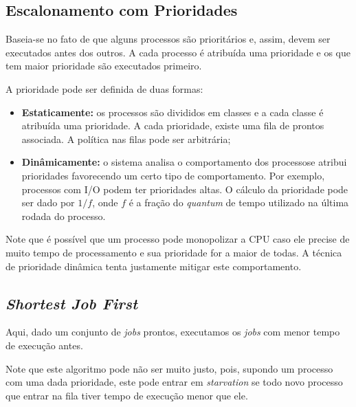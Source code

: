 \subsection{Escalonamento com Prioridades}
Baseia-se no fato de que alguns processos são prioritários e, assim, devem ser executados antes dos outros. A cada processo é atribuída uma prioridade e os que tem maior prioridade são executados primeiro.

A prioridade pode ser definida de duas formas:
\begin{itemize}
  \item \textbf{Estaticamente:} os processos são divididos em classes e a cada classe é atribuída uma prioridade. A cada prioridade, existe uma fila de prontos associada. A política nas filas pode ser arbitrária;

  \item \textbf{Dinâmicamente:} o sistema analisa o comportamento dos processose atribui prioridades favorecendo um certo tipo de comportamento. Por exemplo, processos com I/O podem ter prioridades altas. O cálculo da prioridade pode ser dado por $1/f$, onde $f$ é a fração do \textit{quantum} de tempo utilizado na última rodada do processo.
\end{itemize}

 Note que é possível que um processo pode monopolizar a CPU caso ele precise de muito tempo de processamento e sua prioridade for a maior de todas. A técnica de prioridade dinâmica tenta justamente mitigar este comportamento.





\subsection{\textit{Shortest Job First}}
Aqui, dado um conjunto de \textit{jobs} prontos, executamos os \textit{jobs} com menor tempo de execução antes.

Note que este algoritmo pode não ser muito justo, pois, supondo um processo com uma dada prioridade, este pode entrar em \textit{starvation} se todo novo processo que entrar na fila tiver tempo de execução menor que ele.






















